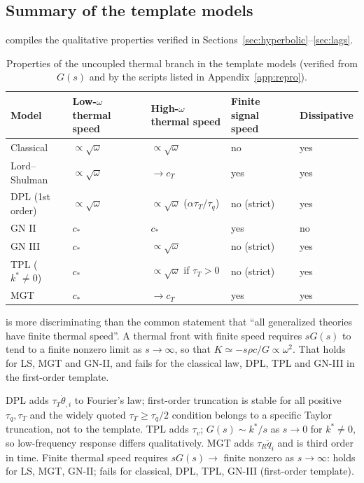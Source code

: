 \subsection{Summary of the template models}
 compiles the qualitative properties verified in Sections~\ref{sec:hyperbolic}--\ref{sec:lags}.
\begin{table}[t]\centering\small
\caption{Properties of the uncoupled thermal branch in the template models (verified from $G(s)$ and by the scripts listed in Appendix~\ref{app:repro}).}\label{tab:compare}
\begin{tabular}{@{}p{3.2cm}p{2.3cm}p{2.3cm}p{2.3cm}p{2.6cm}@{}}\toprule
Model & Low-$\omega$ thermal speed & High-$\omega$ thermal speed & Finite signal speed & Dissipative\\\midrule
Classical & $\propto\sqrt{\omega}$ & $\propto\sqrt{\omega}$ & no & yes\\
Lord--Shulman & $\propto\sqrt{\omega}$ & $\to c_T$ & yes & yes\\
DPL (1st order) & $\propto\sqrt{\omega}$ & $\propto\sqrt{\omega}$ ($\alpha\tau_T/\tau_q$) & no (strict) & yes\\
GN II & $c_*$ & $c_*$ & yes & no\\
GN III & $c_*$ & $\propto\sqrt{\omega}$ & no (strict) & yes\\
TPL ($k^*\neq0$) & $c_*$ & $\propto\sqrt{\omega}$ if $\tau_T>0$ & no (strict) & yes\\
MGT & $c_*$ & $\to c_T$ & yes & yes\\\bottomrule
\end{tabular}
\end{table}
 is more discriminating than the common statement that ``all generalized theories have finite thermal speed''. A thermal front with finite speed requires $sG(s)$ to tend to a finite nonzero limit as $s\to\infty$, so that $K\simeq-s\rho c/G\propto\omega^2$. That holds for LS, MGT and GN-II, and fails for the classical law, DPL, TPL and GN-III in the first-order template.


\begin{summarybox}[Summary]
DPL adds $\tau_T\dot\theta_{,i}$ to Fourier's law; first-order truncation is stable for all positive $\tau_q,\tau_T$ and the widely quoted $\tau_T\ge\tau_q/2$ condition belongs to a specific Taylor truncation, not to the template. TPL adds $\tau_v$; $G(s)\sim k^*/s$ as $s\to0$ for $k^*\ne0$, so low-frequency response differs qualitatively. MGT adds $\tau_R\ddot q_i$ and is third order in time. Finite thermal speed requires $sG(s)\to$ finite nonzero as $s\to\infty$: holds for LS, MGT, GN-II; fails for classical, DPL, TPL, GN-III (first-order template).
\end{summarybox}
